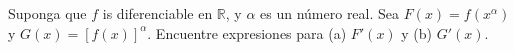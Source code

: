 \item Suponga que $f$ is diferenciable en $\mathbb{R}$, y $\alpha$ es un número real. Sea $F(x) = f(x^\alpha)$ y $G(x) = [f(x)]^\alpha$. Encuentre expresiones para (a) $F'(x)$ y (b) $G'(x)$.
